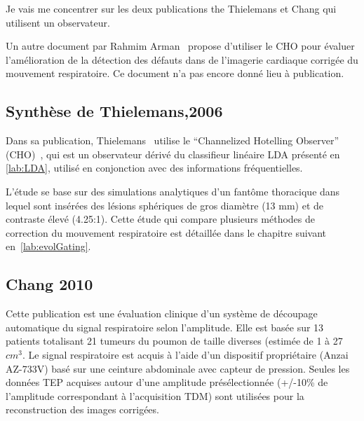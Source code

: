 Je vais me concentrer sur les deux publications the Thielemans et Chang qui utilisent un observateur.

Un autre document par Rahmim Arman~\cite{rahmim4d} propose d'utiliser le CHO pour évaluer l'amélioration de la détection des défauts dans de l'imagerie cardiaque corrigée du mouvement respiratoire. Ce document n'a pas encore donné lieu à publication.
	
\subsection{Synthèse de Thielemans,2006}

Dans sa publication, Thielemans~\cite{Thielemans2006Lesion} utilise le ``Channelized Hotelling Observer'' (CHO)~\cite{barrett1993model}, qui est un observateur dérivé du classifieur linéaire LDA présenté en \ref{lab:LDA}, utilisé en conjonction avec des informations fréquentielles. 

L'étude se base sur des simulations analytiques d'un fantôme thoracique dans lequel sont insérées des lésions sphériques de gros diamètre (13 mm) et de contraste élevé (4.25:1). Cette étude qui compare plusieurs méthodes de correction du mouvement respiratoire est détaillée dans le chapitre suivant en~\ref{lab:evolGating}.
%






\subsection{Chang 2010}

Cette publication est une évaluation clinique d'un système de découpage automatique du signal respiratoire selon l'amplitude. Elle est basée sur 13 patients totalisant 21 tumeurs du poumon de taille diverses (estimée de 1 à 27 $cm^3$. Le signal respiratoire est acquis à l'aide d'un dispositif propriétaire (Anzai AZ-733V) basé sur une ceinture abdominale avec capteur de pression. Seules les données TEP acquises autour d'une amplitude présélectionnée (+/-10\% de l'amplitude correspondant à l'acquisition TDM) sont utilisées pour la reconstruction des images corrigées. 


